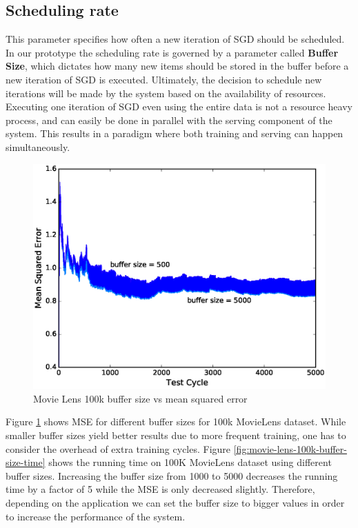 \documentclass{sig-alternate-05-2015}
\begin{document}
\subsection{Scheduling rate}

This parameter specifies how often a new iteration of SGD should be scheduled. 
In our prototype the scheduling rate is governed by a parameter called \textbf{Buffer Size}, which dictates how many new items should be stored in the buffer before a new iteration of SGD is executed. 
Ultimately, the decision to schedule new iterations will be made by the system based on the availability of resources. 
Executing one iteration of SGD even using the entire data is not a resource heavy process, and can easily be done in parallel with the serving component of the system. 
This results in a paradigm where both training and serving can happen simultaneously. 

\begin{figure}[H]
\centering
\includegraphics[width=\columnwidth]{../images/experiment-results/movie-lens-100k-buffer-size.eps}
\caption{Movie Lens 100k buffer size vs mean squared error}
\label{fig:movie-lens-100k-buffer-size-mse}
\end{figure}

Figure \ref{fig:movie-lens-100k-buffer-size-mse} shows MSE for different buffer sizes for 100k MovieLens dataset. 
While smaller buffer sizes yield better results due to more frequent training, one has to consider the overhead of extra training cycles. 
Figure \ref{fig:movie-lens-100k-buffer-size-time} shows the running time on 100K MovieLens dataset using different buffer sizes. 
Increasing the buffer size from 1000 to 5000 decreases the running time by a factor of 5 while the MSE is only decreased slightly. 
Therefore, depending on the application we can set the buffer size to bigger values in order to increase the performance of the system. 
\end{document}
